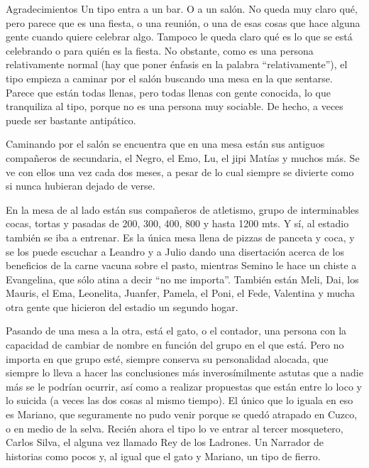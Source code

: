 \documentclass[12pt,papel,singlespace,oneside]{ibtesis}
\begin{document}
\begin{postliminary}


\begin{seccion}{Agradecimientos}
Un tipo entra a un bar. O a un salón. No queda muy claro qué, pero parece que es una fiesta, o una reunión, o una de esas cosas que hace alguna gente cuando quiere celebrar algo. Tampoco le queda claro qué es lo que se está celebrando o para quién es la fiesta. No obstante, como es una persona relativamente normal (hay que poner énfasis en la palabra ``relativamente''), el tipo empieza a caminar por el salón buscando una mesa en la que sentarse. Parece que están todas llenas, pero todas llenas con gente conocida, lo que tranquiliza al tipo, porque no es una persona muy sociable. De hecho, a veces puede ser bastante antipático.

Caminando por el salón se encuentra que en una mesa están sus antiguos compañeros de secundaria, el Negro, el Emo, Lu, el jipi Matías y muchos más. Se ve con ellos una vez cada dos meses, a pesar de lo cual siempre se divierte como si nunca hubieran dejado de verse. 

En la mesa de al lado están sus compañeros de atletismo, grupo de interminables cocas, tortas y pasadas de 200, 300, 400, 800 y hasta 1200 mts. Y sí, al estadio también se iba a entrenar. Es la única mesa llena de pizzas de panceta y coca, y se los puede escuchar a Leandro y a Julio dando una disertación acerca de los beneficios de la carne vacuna sobre el pasto, mientras Semino le hace un chiste a Evangelina, que sólo atina a decir ``no me importa''. También están Meli, Dai, los Mauris, el Ema, Leonelita, Juanfer, Pamela, el Poni, el Fede, Valentina y mucha otra gente que hicieron del estadio un segundo hogar.

Pasando de una mesa a la otra, está el gato, o el contador, una persona con la capacidad de cambiar de nombre en función del grupo en el que está. Pero no importa en que grupo esté, siempre conserva su personalidad alocada, que siempre lo lleva a hacer las conclusiones más inverosímilmente astutas que a nadie más se le podrían ocurrir, así como a realizar propuestas que están entre lo loco y lo suicida (a veces las dos cosas al mismo tiempo). El único que lo iguala en eso es Mariano, que seguramente no pudo venir porque se quedó atrapado en Cuzco, o en medio de la selva. Recién ahora el tipo lo ve entrar al tercer mosquetero, Carlos Silva, el alguna vez llamado Rey de los Ladrones. Un Narrador de historias como pocos y, al igual que el gato y Mariano, un tipo de fierro.


\end{seccion}
\end{postliminary}
\end{document}
